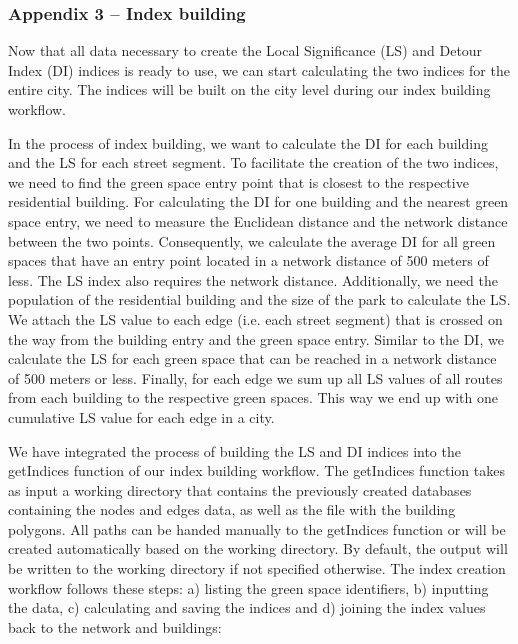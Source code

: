 \documentclass[10pt]{article}
\begin{document}
\subsubsection{Appendix 3 – Index building}

Now that all data necessary to create the Local Significance (LS) and Detour Index (DI) indices is ready to use, we can start calculating the two indices for the entire city.
The indices will be built on the city level during our index building workflow.

In the process of index building, we want to calculate the DI for each building and the LS for each street segment.
To facilitate the creation of the two indices, we need to find the green space entry point that is closest to the respective residential building.
For calculating the DI for one building and the nearest green space entry, we need to measure the Euclidean distance and the network distance between the two points.
Consequently, we calculate the average DI for all green spaces that have an entry point located in a network distance of 500 meters of less.
The LS index also requires the network distance.
Additionally, we need the population of the residential building and the size of the park to calculate the LS.
We attach the LS value to each edge (i.e. each street segment) that is crossed on the way from the building entry and the green space entry. 
Similar to the DI, we calculate the LS for each green space that can be reached in a network distance of 500 meters or less.
Finally, for each edge we sum up all LS values of all routes from each building to the respective green spaces.
This way we end up with one cumulative LS value for each edge in a city.

We have integrated the process of building the LS and DI indices into the getIndices function of our index building workflow.
The getIndices function takes as input a working directory that contains the previously created databases containing the nodes and edges data, as well as the file with the building polygons.
All paths can be handed manually to the getIndices function or will be created automatically based on the working directory.
By default, the output will be written to the working directory if not specified otherwise.
The index creation workflow follows these steps: a) listing the green space identifiers, b) inputting the data, c) calculating and saving the indices and d) joining the index values back to the network and buildings:
\end{document}
